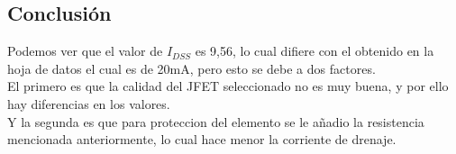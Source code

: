 \vspace{0.1cm}

\subsection{Conclusión}

Podemos ver que el valor de $I_{DSS}$ es 9,56, lo cual difiere con el obtenido en la hoja de datos el cual es de 20mA, pero esto se debe a dos factores.\\
El primero es que la calidad del JFET seleccionado no es muy buena, y por ello hay diferencias en los valores.\\
Y la segunda es que para proteccion del elemento se le añadio la resistencia mencionada anteriormente, lo cual hace menor la corriente de drenaje.